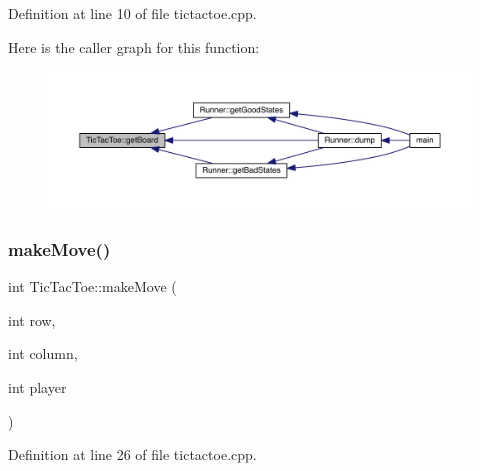 Definition at line 10 of file tictactoe.\+cpp.

Here is the caller graph for this function\+:\nopagebreak
\begin{figure}[H]
\begin{center}
\leavevmode
\includegraphics[width=350pt]{class_tic_tac_toe_aeacd5865fa7f87f6fd9608b8ed1743a9_icgraph}
\end{center}
\end{figure}
\mbox{\label{class_tic_tac_toe_a597a1911309c9350aa6ce48b817a0e9e}} 
\subsubsection{\texorpdfstring{make\+Move()}{makeMove()}}
{\footnotesize\ttfamily int Tic\+Tac\+Toe\+::make\+Move (\begin{DoxyParamCaption}\item[{int}]{row,  }\item[{int}]{column,  }\item[{int}]{player }\end{DoxyParamCaption})}



Definition at line 26 of file tictactoe.\+cpp.

